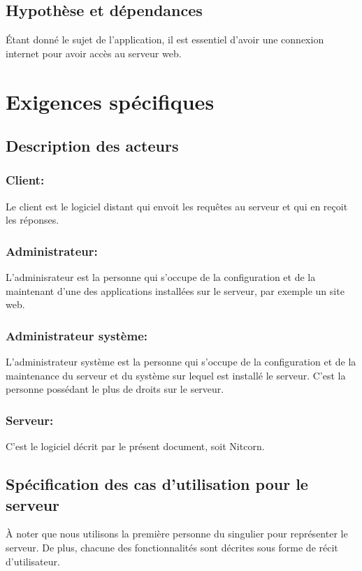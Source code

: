 \documentclass{scrreprt}
\begin{document}
 
    
\section{Hypothèse et dépendances}
Étant donné le sujet de l'application, il est essentiel d'avoir une connexion internet pour avoir accès au serveur web.\\



\chapter{Exigences spécifiques}

\section{Description des acteurs}
\subsection{Client:} Le client est le logiciel distant qui envoit les requêtes au serveur et qui en reçoit les réponses. 
\subsection{Administrateur:} L'adminisrateur est la personne qui s'occupe de la configuration et de la maintenant d'une des applications installées sur le serveur, par exemple un site web.
\subsection{Administrateur système:} L'administrateur système est la personne qui s'occupe de la configuration et de la maintenance du serveur et du système sur lequel est installé le serveur. C'est la personne possédant le plus de droits sur le serveur.
\subsection{Serveur:} C'est le logiciel décrit par le présent document, soit Nitcorn.




\section{Spécification des cas d'utilisation pour le serveur} 
À noter que nous utilisons la première personne du singulier pour représenter le serveur. De plus, chacune des fonctionnalités sont décrites sous forme de récit d'utilisateur.
\end{document}
